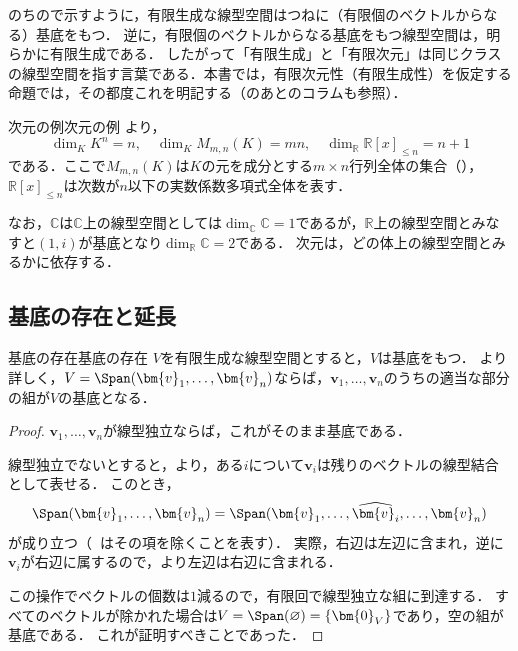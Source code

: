 のちので示すように，有限生成な線型空間はつねに（有限個のベクトルからなる）基底をもつ．
逆に，有限個のベクトルからなる基底をもつ線型空間は，明らかに有限生成である．
したがって「有限生成」と「有限次元」は同じクラスの線型空間を指す言葉である．本書では，有限次元性（有限生成性）を仮定する命題では，その都度これを明記する（のあとのコラムも参照）．

\begin{example}{次元の例}{次元の例}
  より，
  \[
    \dim_K K^n = n,
    \quad
    \dim_K M_{m,n}(K) = mn,
    \quad
    \dim_{\mathbb{R}} \mathbb{R}[x]_{\le n} = n + 1
  \]
  である．ここで$M_{m,n}(K)$は$K$の元を成分とする$m \times n$行列全体の集合（），$\mathbb{R}[x]_{\le n}$は次数が$n$以下の実数係数多項式全体を表す．

  なお，$\mathbb{C}$は$\mathbb{C}$上の線型空間としては$\dim_{\mathbb{C}} \mathbb{C} = 1$であるが，$\mathbb{R}$上の線型空間とみなすと$(1, i)$が基底となり$\dim_{\mathbb{R}} \mathbb{C} = 2$である．
  次元は，どの体上の線型空間とみるかに依存する．
\end{example}

\subsection{基底の存在と延長}

\begin{theorem}{基底の存在}{基底の存在}
  $V$を有限生成な線型空間とすると，$V$は基底をもつ．
  より詳しく，$V = \Span(\bm{v}_1, \dots, \bm{v}_n)$ならば，$\bm{v}_1, \dots, \bm{v}_n$のうちの適当な部分の組が$V$の基底となる．
\end{theorem}

\begin{leftbar}
\begin{proof}
  $\bm{v}_1, \dots, \bm{v}_n$が線型独立ならば，これがそのまま基底である．

  線型独立でないとすると，より，ある$i$について$\bm{v}_i$は残りのベクトルの線型結合として表せる．
  このとき，
  \[
    \Span(\bm{v}_1, \dots, \bm{v}_n)
    = \Span(\bm{v}_1, \dots, \widehat{\bm{v}_i}, \dots, \bm{v}_n)
  \]
  が成り立つ（$\widehat{\phantom{x}}$はその項を除くことを表す）．
  実際，右辺は左辺に含まれ，逆に$\bm{v}_i$が右辺に属するので，より左辺は右辺に含まれる．

  この操作でベクトルの個数は$1$減るので，有限回で線型独立な組に到達する．
  すべてのベクトルが除かれた場合は$V = \Span(\varnothing) = \{\bm{0}_V\}$であり，空の組が基底である．
  これが証明すべきことであった．
\end{proof}
\end{leftbar}

